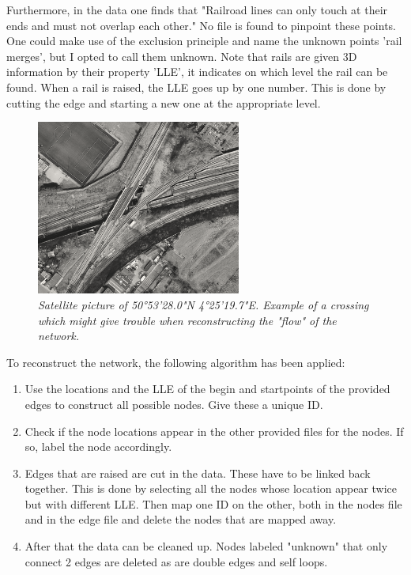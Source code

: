 Furthermore, in the data one finds that "Railroad lines can only touch at their ends and must not overlap each other." No file is found to pinpoint these points. One could make use of the exclusion principle and name the unknown points 'rail merges', but I opted to call them unknown. Note that rails are given 3D information by their property 'LLE', it indicates on which level the rail can be found. When a rail is raised, the LLE goes up by one number. This is done by cutting the edge and starting a new one at the appropriate level.
\begin{figure}[H]
\begin{center}
	\includegraphics[width=0.6\textwidth]{rail2.png}

 
	\caption{\emph{Satellite picture of 50°53'28.0"N 4°25'19.7"E. Example of a crossing which might give trouble when reconstructing the "flow" of the network.}}
	\label{rail1.png}
\end{center}
\end{figure}
To reconstruct the network, the following algorithm has been applied:

\begin{enumerate}
    \item Use the locations and the LLE of the begin and startpoints of the provided edges to construct all possible nodes. Give these a unique ID.
    \item Check if the node locations appear in the other provided files for the nodes. If so, label the node accordingly.
    \item Edges that are raised are cut in the data. These have to be linked back together. This is done by selecting all the nodes whose location appear twice but with different LLE. Then map one ID on the other, both in the nodes file and in the edge file and delete the nodes that are mapped away.
    \item After that the data can be cleaned up. Nodes labeled "unknown" that only connect 2 edges are deleted as are double edges and self loops.
\end{enumerate}

